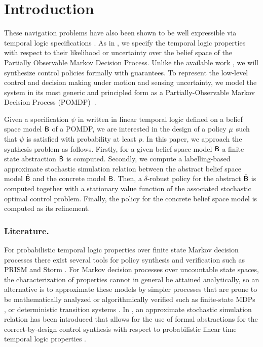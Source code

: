 \documentclass{ifacconf}
\begin{document}
\section{Introduction }\label{subsec:intro}


    
These navigation problems have also been shown to be well expressible via temporal logic specifications \citep{Murray2009}. 
As in \citep{JonesDTL2013}, we specify the temporal logic properties with respect to their likelihood or uncertainty over the belief space of the Partially Observable Markov Decision Process.
Unlike the available work \citep{Vasile2016,JonesDTL2013}, we will synthesize control policies formally with guarantees.
    To represent the low-level control and decision making under motion and sensing uncertainty, we model the system
    in its most generic and principled form as a Partially-Observable Markov Decision Process
    (POMDP)~\citep{Kaelbling98,Smallwood73}.
    
    
    

Given a specification $\psi$ in written in linear temporal logic defined on a belief space model $\mathsf{B}$ of a POMDP, we are interested 
in the design of a policy ${\mu}$ such that  $\psi$ is satisfied with probability at least $p$.
%
In this paper, we approach the synthesis problem as follows. 
Firstly,  for a given belief space model $\mathsf{B}$ a finite state abstraction  $\tilde {\mathsf{B}}$ is computed.
Secondly,  we compute a labelling-based approximate stochastic  simulation relation between the abstract belief space model  $\tilde{\mathsf{B}}$ and the concrete model $\mathsf{B}$.
 Then,  a $\delta$-robust policy for the abstract $\tilde{\mathsf{B}}$ is computed  together with a stationary value function of the associated stochastic optimal control problem.
  Finally, the policy for the concrete belief space model is computed  as its refinement.





\subsubsection{Literature.}For probabilistic temporal logic properties  over finite state Markov decision processes %
there exist several tools for policy synthesis and verification such as PRISM \citep{KNP11} and  Storm \citep{dehnert2017storm}. 
For Markov decision processes over uncountable state spaces,  the characterization of properties cannot in general be
attained analytically, \citep{Abate1} so an alternative is to approximate these models by simpler
processes that are prone to be mathematically analyzed or algorithmically verified
such as finite-state MDPs \citep{soudjani2015faust},   or deterministic transition systems \citep{ZMMAL14}.	
 In \citep{haesaert2017verification}, an approximate stochastic simulation relation has been introduced that allows for the use of  formal abstractions for the correct-by-design control synthesis with respect to probabilistic linear time temporal logic properties \citep{tech_report_TACAS}. 
 
\end{document}
